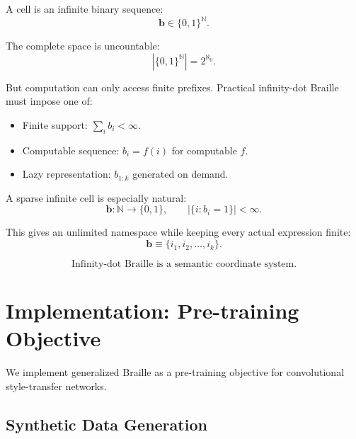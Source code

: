 \documentclass[11pt,a4paper]{article}
\newcommand{\N}{\mathbb{N}}
\newcommand{\bvec}{\bm{b}}
\begin{document}
A cell is an infinite binary sequence:
\begin{equation}
  \bvec \in \{0,1\}^{\N}.
\end{equation}

The complete space is uncountable:
\begin{equation}
  \left|\{0,1\}^{\N}\right| = 2^{\aleph_0}.
\end{equation}

But computation can only access finite prefixes.
Practical infinity-dot Braille must impose one of:
\begin{itemize}
  \item Finite support: $\sum_i b_i < \infty$.
  \item Computable sequence: $b_i = f(i)$ for computable $f$.
  \item Lazy representation: $b_{1:k}$ generated on demand.
\end{itemize}

A sparse infinite cell is especially natural:
\begin{equation}
  \bvec: \N \rightarrow \{0,1\}, \qquad
  |\{i : b_i = 1\}| < \infty.
\end{equation}

This gives an unlimited namespace while keeping every actual
expression finite:
\begin{equation}
  \bvec \equiv \{i_1, i_2, \ldots, i_k\}.
\end{equation}

\begin{equation}
  \boxed{
    \text{Infinity-dot Braille is a semantic coordinate system.}
  }
\end{equation}

\section{Implementation: Pre-training Objective}
\label{sec:implementation}

We implement generalized Braille as a pre-training objective for
convolutional style-transfer networks.

\subsection{Synthetic Data Generation}
\end{document}
